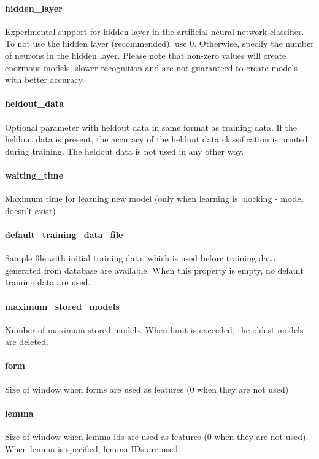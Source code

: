 \paragraph{hidden\_layer}
Experimental support for hidden layer in the artificial neural network classifier.
To not use the hidden layer (recommended), use 0. Otherwise, specify the number
of neurons in the hidden layer. Please note that non-zero values will create
enormous models, slower recognition and are not guaranteed to create models with
better accuracy.

\paragraph{heldout\_data}
Optional parameter with heldout data in same format as training data. If the heldout data
is present, the accuracy of the heldout data classification is printed during
training. The heldout data is not used in any other way.

\paragraph{waiting\_time}
Maximum time for learning new model (only when learning is blocking - model doesn't exist)


\paragraph{default\_training\_data\_file}
Sample file with initial training data, which is used before training data
generated from database are available. When this property is empty, no default training data
are used.

\paragraph{maximum\_stored\_models}
Number of maximum stored models. When limit is exceeded, the oldest models are deleted.

\paragraph{form}
Size of window when forms are used as features (0 when they are not used)

\paragraph{lemma}
Size of window when lemma ids are used as features (0 when they are not used).
When lemma is specified, lemma IDs are used.

